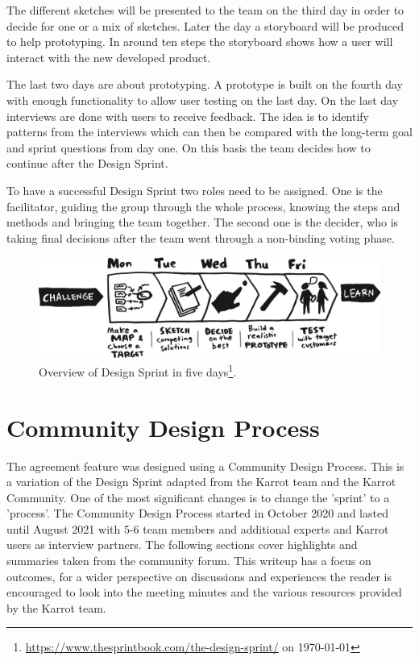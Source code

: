 \documentclass[
	a4paper,%
	11pt,%
	]{article}
\begin{document}
The different sketches will be presented to the team on the third day in order to decide for one or a mix of sketches. Later the day a storyboard will be produced to help prototyping. In around ten steps the storyboard shows  how a user will interact with the new developed product.

The last two days are about prototyping. A prototype is built on the fourth day with enough functionality to allow user testing on the last day. On the last day interviews are done with users to receive feedback. The idea is to identify patterns from the interviews which can then be compared with the long-term goal and sprint questions from day one. On this basis the team decides how to continue after the Design Sprint.

To have a successful Design Sprint two roles need to be assigned. One is the facilitator, guiding the group through the whole process, knowing the steps and methods and bringing the team together. The second one is the decider, who is taking final decisions after the team went through a non-binding voting phase.

\begin{figure}[ht]
	\includegraphics[width=\textwidth,
	]{images/sprint_process_overview.png}
	\caption[Overview of Design Sprint in five days]{Overview of Design Sprint in five days\footnote{\label{url:google_sprint_img}\url{https://www.thesprintbook.com/the-design-sprint/} on \today}.}
	\label{fig:design-sprint}
\end{figure}


\section{Community Design Process}

The agreement feature was designed using a Community Design Process. This is a variation of the Design Sprint adapted from the Karrot team and the Karrot Community. One of the most significant changes is to change the 'sprint' to a 'process'. The Community Design Process started in October 2020 and lasted until August 2021 with 5-6 team members and additional experts and Karrot users as interview partners. The following sections cover highlights and summaries taken from the community forum. This writeup has a focus on outcomes, for a wider perspective on discussions and experiences the reader is encouraged to look into the meeting minutes and the various resources provided by the Karrot team.
\end{document}
